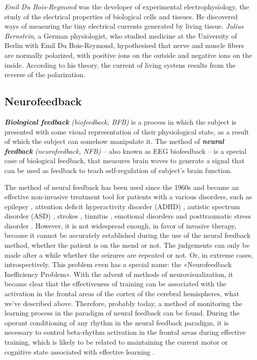 \documentclass[14pt,a4paper]{scrartcl}
\begin{document}
\textit{Emil Du Bois-Reymond} was the developer of experimental electrophysiology, the study of the electrical properties of biological cells and tissues. He discovered ways of measuring the tiny electrical currents generated by living tissue. \textit{Julius Bernstein}, a German physiologist, who studied medicine at the University of Berlin with Emil Du Bois-Reymond, hypothesised that nerve and muscle fibers are normally polarized, with positive ions on the outside and negative ions on the inside. According to his theory, the current of living systens results from the reverse of the polarization.


\subsection{Neurofeedback}
\label{sec:Hypothesis:Neurofeedback}

\textit{\textbf{Biological feedback} (biofeedback, BFB)} is a process in which the subject is presented with some visual representation of their physiological state, as a result of which the subject can somehow manipulate it. The method of \textit{\textbf{neural feedback} (neurofeedback, NFB)} – also known as EEG biofeedback – is a special case of biological feedback, that measures brain waves to generate a signal that can be used as feedback to teach self-regulation of subject's brain function. 

The method of neural feedback has been used since the 1960s and became an effective non-invasive treatment tool for patients with a various disorders, such as epilepsy \cite{Strehl2014,Kotchoubey2001}, attention deficit hyperactivity disorder (ADHD) \cite{Leins2007,Sonuga-Barke2013,Thompson2005}, autistic spectrum disorder (ASD) \cite{Kouijzer2009,Thompson2009}, strokes \cite{Rayegani2014}, tinnitus \cite{Hartmann2014}, emotional disorders \cite{Raymond2005} and posttraumatic stress disorder \cite{Othmer2009}. However, it is not widespread enough, in favor of invasive therapy, because it cannot be accurately established during the use of the neural feedback method, whether the patient is on the mend or not. The judgements can only be made after a while whether the seizures are repeated or not. Or, in extreme cases, introspectively. This problem even has a special name: the «Neurofeedback Inefficiency Problem». With the advent of methods of neurovisualization, it became clear that the effectiveness of training can be associated with the activation in the frontal areas of the cortex of the cerebral hemispheres, what we’ve described above. Therefore, probably today, a method of monitoring the learning process in the paradigm of neural feedback can be found. During the operant conditioning of any rhythm in the neural feedback paradigm, it is necessary to control beta-rhythm activation in the frontal areas during effective training, which is likely to be related to maintaining the current motor or cognitive state associated with effective learning \cite{Engel2010}.
\end{document}
